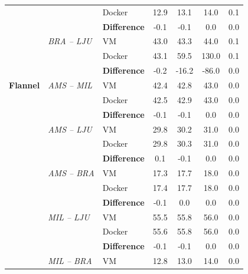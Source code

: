 \begin{appendices}
\begin{longtable}{@{\extracolsep{\fill}}lllcccc@{}}
 &  & {\color[HTML]{333333} Docker} & 12.9 & 13.1 & 14.0 & 0.1 \\ \cmidrule(l){3-7} 
 &  & {\color[HTML]{333333} \textbf{Difference}} & {\color[HTML]{CB0000} -0.1} & {\color[HTML]{CB0000} -0.1} & 0.0 & 0.0 \\ \cmidrule(l){2-7} 
 & \textit{BRA – LJU} & {\color[HTML]{333333} VM} & 43.0 & 43.3 & 44.0 & 0.1 \\
 & \textit{} & {\color[HTML]{333333} Docker} & 43.1 & 59.5 & 130.0 & 0.1 \\ \cmidrule(l){3-7} 
 & \textit{} & {\color[HTML]{333333} \textbf{Difference}} & {\color[HTML]{CB0000} -0.2} & {\color[HTML]{CB0000} -16.2} & {\color[HTML]{CB0000} -86.0} & 0.0 \\ \midrule
\textbf{Flannel} & \textit{AMS – MIL} & {\color[HTML]{333333} VM} & 42.4 & 42.8 & 43.0 & 0.0 \\
 & \textit{} & {\color[HTML]{333333} Docker} & 42.5 & 42.9 & 43.0 & 0.0 \\ \cmidrule(l){3-7} 
 & \textit{} & {\color[HTML]{333333} \textbf{Difference}} & {\color[HTML]{CB0000} -0.1} & {\color[HTML]{CB0000} -0.1} & 0.0 & 0.0 \\ \cmidrule(l){2-7} 
 & \textit{AMS – LJU} & {\color[HTML]{333333} VM} & 29.8 & 30.2 & 31.0 & 0.0 \\
 & \textit{} & {\color[HTML]{333333} Docker} & 29.8 & 30.3 & 31.0 & 0.0 \\ \cmidrule(l){3-7} 
 & \textit{} & {\color[HTML]{333333} \textbf{Difference}} & 0.1 & {\color[HTML]{CB0000} -0.1} & 0.0 & 0.0 \\ \cmidrule(l){2-7} 
 & \textit{AMS – BRA} & {\color[HTML]{333333} VM} & 17.3 & 17.7 & 18.0 & 0.0 \\
 & \textit{} & {\color[HTML]{333333} Docker} & 17.4 & 17.7 & 18.0 & 0.0 \\ \cmidrule(l){3-7} 
 &  & {\color[HTML]{333333} \textbf{Difference}} & {\color[HTML]{CB0000} -0.1} & 0.0 & 0.0 & 0.0 \\ \cmidrule(l){2-7} 
 & \textit{MIL – LJU} & {\color[HTML]{333333} VM} & 55.5 & 55.8 & 56.0 & 0.0 \\
 & \textit{} & {\color[HTML]{333333} Docker} & 55.6 & 55.8 & 56.0 & 0.0 \\
 & \textit{} & {\color[HTML]{333333} \textbf{Difference}} & {\color[HTML]{CB0000} -0.1} & {\color[HTML]{CB0000} -0.1} & 0.0 & 0.0 \\ \cmidrule(l){2-7} 
 & \textit{MIL – BRA} & {\color[HTML]{333333} VM} & 12.8 & 13.0 & 14.0 & 0.0 \\

\end{longtable}
\end{appendices}
